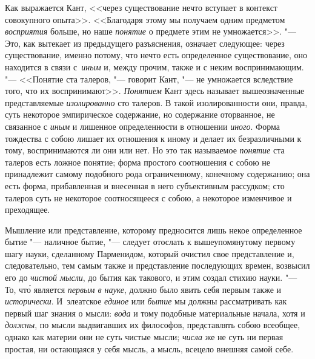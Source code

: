 Как выражается Кант, <<через существование нечто вступает в контекст
совокупного опыта>>. <<Благодаря этому мы получаем одним предметом
{\em восприятия} больше, но наше {\em понятие} о предмете этим не
умножается>>. "--- Это, как вытекает из
предыдущего разъяснения, означает следующее: через существование, именно
потому, что нечто есть определенное существование, оно находится в связи
с~{\em иным} и, между прочим, также и с неким воспринимающим. "--- <<Понятие
ста талеров, "--- говорит Кант, "--- не умножается вследствие того, что их
воспринимают>>. {\em Понятием} Кант здесь называет вышеозначенные
представляемые {\em изолированно} сто талеров. В такой изолированности они,
правда, суть некоторое эмпирическое содержание, но содержание оторванное, не
связанное с {\em иным} и лишенное определенности в отношении {\em иного}. Форма
тождества с собою лишает их отношения к иному и делает их безразличными к тому,
воспринимаются ли они или нет. Но это так называемое {\em понятие} ста талеров
есть ложное понятие; форма простого соотношения с собою не принадлежит самому
подобного рода ограниченному, конечному содержанию; она есть форма,
прибавленная и внесенная в него субъективным рассудком; сто талеров суть не
некоторое соотносящееся с собою, а некоторое изменчивое и преходящее.

Мышление или представление, которому предносится лишь некое определенное бытие
"--- наличное бытие, "--- следует отослать к вышеупомянутому первому шагу
науки, сделанному Парменидом, который очистил свое представление и,
следовательно, тем самым также и представление последующих времен, возвысил его
до {\em чистой мысли}, до бытия как такового, и этим создал стихию науки. "---
То, чт\'{о} является {\em первым в науке}, должно было явить себя первым также
и {\em исторически}. И~элеатское {\em единое} или {\em бытие} мы должны
рассматривать как первый шаг знания о мысли: {\em вода} и тому подобные материальные
начала, хотя и {\em должны}, по мысли выдвигавших их философов, представлять
собою всеобщее, однако как материи они не суть чистые мысли;
{\em числа} же не суть ни первая простая, ни остающаяся у себя мысль, а мысль,
всецело внешняя самой себе.

